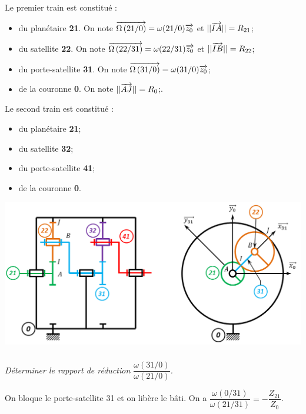 \documentclass[10pt,fleqn]{article} %
\begin{document}
\begin{multicols}{2}
\begin{multicols}{2}
Le premier train est constitué :
\begin{itemize}
\item du planétaire \textbf{21}. On note $\overrightarrow{\Omega\left( {21}/{0}\right)}=\omega(21/0)\overrightarrow{z_0}$ et $||\overrightarrow{IA}|| =R_{21} $;
\item du satellite \textbf{22}. On note $\overrightarrow{\Omega\left( {22}/{31}\right)}=\omega(22/31)\overrightarrow{z_0}$ et $||\overrightarrow{IB}|| =R_{22}$;
\item du porte-satellite \textbf{31}. On note $\overrightarrow{\Omega\left( {31}/{0}\right)}=\omega(31/0)\overrightarrow{z_0}$;
\item de la couronne \textbf{0}. On note  $||\overrightarrow{AJ}|| =R_{0}$;.
\end{itemize}
Le second train est constitué :
\begin{itemize}
\item du planétaire \textbf{21};
\item du satellite \textbf{32};
\item du porte-satellite \textbf{41};
\item de la couronne \textbf{0}.
\end{itemize}


\fi


\begin{center}
\includegraphics[width=\linewidth]{images/A6_train}
\end{center}

\subparagraph{}
\textit{Déterminer le rapport de réduction $\dfrac{\omega(31/0)}{\omega(21/0)}$.}
\ifprof
\begin{corrige}
On bloque le porte-satellite 31 et on libère le bâti. On a $\dfrac{\omega(0/31)}{\omega(21/31)}=-\dfrac{Z_{21}}{Z_0}$.


\end{corrige}
\end{multicols}
\end{multicols}
\end{document}
